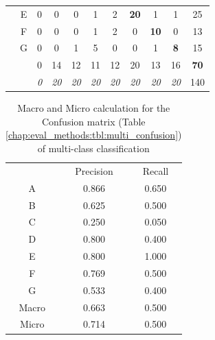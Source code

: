\begin{table}[H]
\begin{tabular}{c c c c c c c c c c c}
		& \multicolumn{1}{|c}{E} & \multicolumn{1}{|c}{0} & \multicolumn{1}{c}{0} & \multicolumn{1}{c}{0} & \multicolumn{1}{c}{1} & \multicolumn{1}{c}{2} & \multicolumn{1}{c}{\textbf{20}} & \multicolumn{1}{c}{1} & \multicolumn{1}{c|}{1} & 25 \\
		& \multicolumn{1}{|c}{F} & \multicolumn{1}{|c}{0} & \multicolumn{1}{c}{0} & \multicolumn{1}{c}{0} & \multicolumn{1}{c}{1} & \multicolumn{1}{c}{2} & \multicolumn{1}{c}{0} & \multicolumn{1}{c}{\textbf{10}} & \multicolumn{1}{c|}{0} & 13 \\
		& \multicolumn{1}{|c}{G} & \multicolumn{1}{|c}{0} & \multicolumn{1}{c}{0} & \multicolumn{1}{c}{1} & \multicolumn{1}{c}{5} & \multicolumn{1}{c}{0} & \multicolumn{1}{c}{0} & \multicolumn{1}{c}{1} & \multicolumn{1}{c|}{\textbf{8}} & 15 \\
		\cline{2-10}
		& & 0 & 14 & 12 & 11 & 12 & 20 & 13 & 16 & \textbf{70}\\
		\cline{3-11}
		& & \textit{0} & \textit{20} & \textit{20} & \textit{20} & \textit{20} & \textit{20} & \textit{20} & \textit{20} & 140\\
	\end{tabular}
\end{table}


\begin{table}[H]
	\center
	\caption{Macro and Micro calculation for the Confusion matrix (Table \ref{chap:eval_methods:tbl:multi_confusion}) of multi-class classification}\label{chap:eval_methods:tbl:macro_vs_micro}
	\begin{tabular}{l l l}
		\cline{2-3}
		& \multicolumn{1}{|c}{Precision} & \multicolumn{1}{c|}{Recall}\\
		\cline{1-3}
		\multicolumn{1}{|c}{A} & \multicolumn{1}{|c}{0.866} & \multicolumn{1}{c|}{0.650}\\
		\multicolumn{1}{|c}{B} & \multicolumn{1}{|c}{0.625} & \multicolumn{1}{c|}{0.500}\\
		\multicolumn{1}{|c}{C} & \multicolumn{1}{|c}{0.250} & \multicolumn{1}{c|}{0.050}\\
		\multicolumn{1}{|c}{D} & \multicolumn{1}{|c}{0.800} & \multicolumn{1}{c|}{0.400}\\
		\multicolumn{1}{|c}{E} & \multicolumn{1}{|c}{0.800} & \multicolumn{1}{c|}{1.000}\\
		\multicolumn{1}{|c}{F} & \multicolumn{1}{|c}{0.769} & \multicolumn{1}{c|}{0.500}\\
		\multicolumn{1}{|c}{G} & \multicolumn{1}{|c}{0.533} & \multicolumn{1}{c|}{0.400}\\
		\cline{1-3}
		\multicolumn{1}{|c}{Macro} & \multicolumn{1}{|c}{0.663} & \multicolumn{1}{c|}{0.500}\\
		\multicolumn{1}{|c}{Micro} & \multicolumn{1}{|c}{0.714} & \multicolumn{1}{c|}{0.500}\\
		\cline{1-3}
	\end{tabular}
\end{table}


